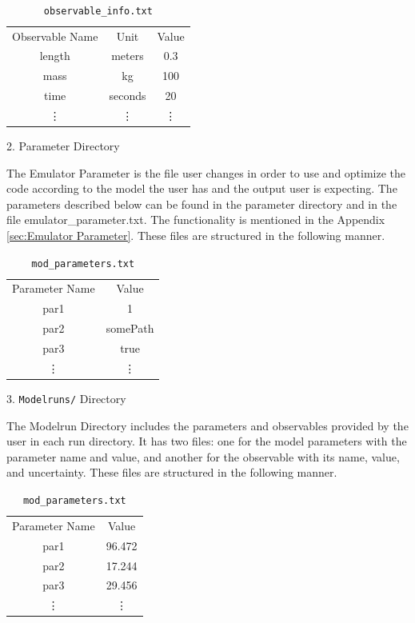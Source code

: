 \documentclass[12pt]{article}
\numberwithin{equation}{section}
\numberwithin{figure}{section}
\begin{document}
 \\ 
 
\begin{table}[!h]
    \centering
    \begin{tabular}{c|c|c}
         Observable Name & Unit & Value\\
         length & meters & 0.3 \\
         mass & kg & 100 \\
         time & seconds & 20 \\
          \vdots & \vdots & \vdots 
    \end{tabular}
    \caption{{\tt{observable\_info.txt}}}
    \label{tab:my_label}
\end{table}

2. Parameter Directory 

The Emulator Parameter is the file user changes in order to use and optimize the code according to the model the user has and the output user is expecting. The parameters described below can be found in the parameter directory and in the file emulator\_parameter.txt. The functionality is mentioned in the Appendix \ref{sec:Emulator Parameter}. These files are structured in the following manner.

\begin{table}[!h]
    \centering
    \begin{tabular}{c|c}
         Parameter Name & Value \\
         par1 & 1 \\
         par2 & somePath \\
         par3 & true \\
          \vdots & \vdots 
    \end{tabular}
    \caption{{\tt{mod\_parameters.txt}}}
    \label{tab:my_label}
\end{table}

\newpage

3. {\tt Modelruns/} Directory

The Modelrun Directory includes the parameters and observables provided by the user in each run directory. It has two files: one for the model parameters with the parameter name and value, and another for the observable with its name, value, and uncertainty. These files are structured in the following manner.

\begin{table}[!h]
    \centering
    \begin{tabular}{c|c}
         Parameter Name & Value \\
         par1 & 96.472 \\
         par2 & 17.244 \\
         par3 & 29.456 \\
          \vdots & \vdots 
    \end{tabular}
    \caption{{\tt{mod\_parameters.txt}}}
    \label{tab:my_label}
\end{table}
\end{document}
